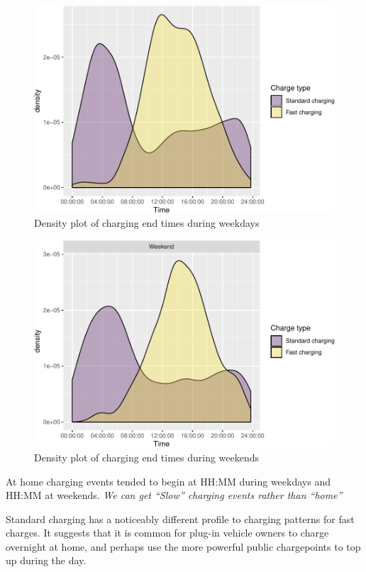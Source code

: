 \documentclass[]{article}
\begin{document}
\begin{figure}
\centering
\includegraphics{EVBB_report_files/figure-latex/chargeEndsWeekday-1.pdf}
\caption{\label{fig:chargeEndsWeekday}Density plot of charging end times
during weekdays}
\end{figure}

\begin{figure}
\centering
\includegraphics{EVBB_report_files/figure-latex/chargeEndsWeekend-1.pdf}
\caption{\label{fig:chargeEndsWeekend}Density plot of charging end times
during weekends}
\end{figure}

At home charging events tended to begin at HH:MM during weekdays and
HH:MM at weekends. \emph{We can get ``Slow'' charging events rather than
``home''}

Standard charging has a noticeably different profile to charging
patterns for fast charges. It suggests that it is common for plug-in
vehicle owners to charge overnight at home, and perhaps use the more
powerful public chargepoints to top up during the day.
\end{document}
